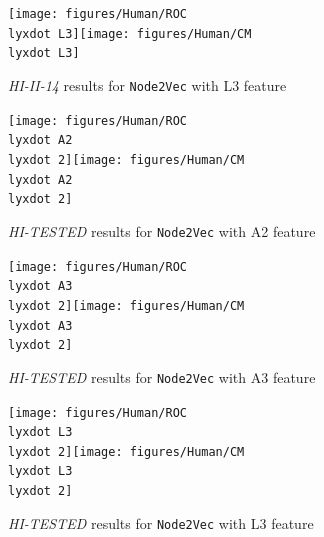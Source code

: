 \begin{figure}[h]
\noindent \begin{centering}
\caption{\label{HI3}\emph{HI-II-14} results for \texttt{Node2Vec} with L3
feature}
\par\end{centering}
\noindent \raggedleft{}\texttt{[image: figures/Human/ROC\\lyxdot L3]}\texttt{[image: figures/Human/CM\\lyxdot L3]}
\end{figure}

\begin{figure}[h]
\noindent \begin{centering}
\caption{\label{HI1-1}\emph{HI-TESTED} results for \texttt{Node2Vec} with
A2 feature}
\par\end{centering}
\noindent \raggedleft{}\texttt{[image: figures/Human/ROC\\lyxdot A2\\lyxdot 2]}\texttt{[image: figures/Human/CM\\lyxdot A2\\lyxdot 2]}
\end{figure}

\begin{figure}[h]
\noindent \begin{centering}
\caption{\label{HI2-1}\emph{HI-TESTED} results for \texttt{Node2Vec} with
A3 feature}
\par\end{centering}
\noindent \raggedleft{}\texttt{[image: figures/Human/ROC\\lyxdot A3\\lyxdot 2]}\texttt{[image: figures/Human/CM\\lyxdot A3\\lyxdot 2]}
\end{figure}

\begin{figure}[h]
\noindent \begin{centering}
\caption{\label{HI3-1}\emph{HI-TESTED} results for \texttt{Node2Vec} with
L3 feature}
\par\end{centering}
\noindent \raggedleft{}\texttt{[image: figures/Human/ROC\\lyxdot L3\\lyxdot 2]}\texttt{[image: figures/Human/CM\\lyxdot L3\\lyxdot 2]}
\end{figure}

